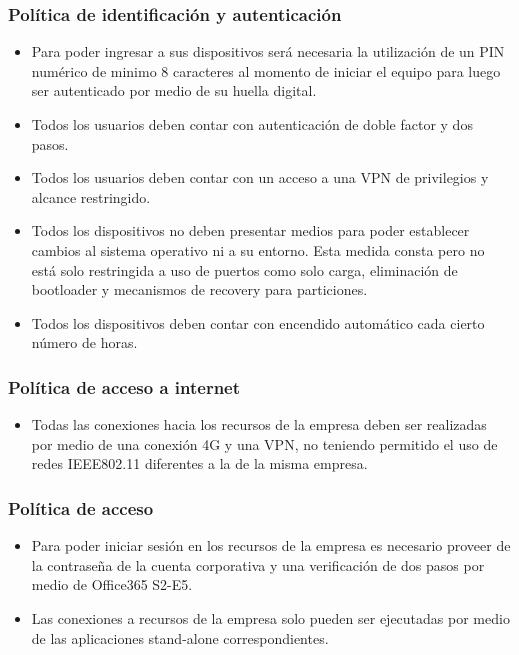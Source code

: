 \documentclass[11pt]{utalcaDoc}
\begin{document}
\subsubsection{Política de identificación y autenticación}
\begin{itemize}
    \item Para poder ingresar a sus dispositivos será necesaria la utilización de un PIN numérico de minimo 8 caracteres al momento de iniciar el equipo para luego ser autenticado por medio de su huella digital.
    \item Todos los usuarios deben contar con autenticación de doble factor y dos pasos.
    \item Todos los usuarios deben contar con un acceso a una VPN de privilegios y alcance restringido.
    \item Todos los dispositivos no deben presentar medios para poder establecer cambios al sistema operativo ni a su entorno. Esta medida consta pero no está solo restringida a uso de puertos como solo carga, eliminación de bootloader y mecanismos de recovery para particiones.
    \item Todos los dispositivos deben contar con encendido automático cada cierto número de horas.
\end{itemize}

\subsubsection{Política de acceso a internet}
\begin{itemize}
    \item Todas las conexiones hacia los recursos de la empresa deben ser realizadas por medio de una conexión 4G y una VPN, no teniendo permitido el uso de redes IEEE802.11 diferentes a la de la misma empresa.
\end{itemize}

\subsubsection{Política de acceso}
\begin{itemize}
    \item Para poder iniciar sesión en los recursos de la empresa es necesario proveer de la contraseña de la cuenta corporativa y una verificación de dos pasos por medio de Office365 S2-E5.
    \item Las conexiones a recursos de la empresa solo pueden ser ejecutadas por medio de las aplicaciones stand-alone correspondientes.
\end{itemize}
\end{document}
